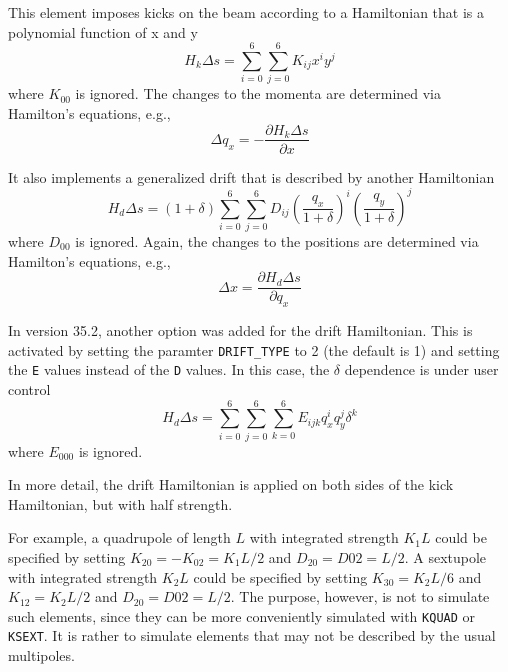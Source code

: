 This element imposes kicks on the beam according
to a Hamiltonian that is a polynomial function of x and y 
\begin{equation}
H_k\Delta s = \sum_{i=0}^{6} \sum_{j=0}^{6} K_{ij} x^i y^j 
\end{equation}
where $K_{00}$ is ignored.
The changes to the momenta are determined via Hamilton's equations, e.g.,
\begin{equation}
\Delta q_x = -\frac{\partial H_k\Delta s}{\partial x}
\end{equation}

It also implements a generalized drift that is described by another Hamiltonian
\begin{equation}
H_d\Delta s = (1+\delta) \sum_{i=0}^{6} \sum_{j=0}^{6} D_{ij} \left(\frac{q_x}{1+\delta}\right)^i \left(\frac{q_y}{1+\delta}\right)^j
\end{equation}
where $D_{00}$ is ignored.
Again, the changes to the positions are determined via Hamilton's equations, e.g., 
\begin{equation}
\Delta x = \frac{\partial H_d\Delta s}{\partial q_x}
\end{equation}

In version 35.2, another option was added for the drift Hamiltonian.
This is activated by setting the paramter \verb|DRIFT_TYPE| to 2 (the default is 1)
and setting the \verb|E| values instead of the \verb|D| values.
In this case, the $\delta$ dependence is under user control
\begin{equation}
H_d\Delta s = \sum_{i=0}^{6} \sum_{j=0}^{6} \sum_{k=0}^{6} E_{ijk} q_x^i q_y^j \delta^k
\end{equation}
where $E_{000}$ is ignored.

In more detail, the drift Hamiltonian is applied on both sides of the kick Hamiltonian, but with
half strength. 

For example, a quadrupole of length $L$ with integrated strength $K_1 L$  could be specified by setting
$K_{20} = -K_{02} = K_1 L/2$ and $D_20 = D02 = L/2$.
A sextupole with integrated strength $K_2 L$ could be specified by setting $K_{30} = K_2 L/6$ and $K_{12} = K_2 L/2$
and $D_20 = D02 = L/2$.
The purpose, however, is not to simulate such elements, since they can be more conveniently simulated with 
\verb|KQUAD| or \verb|KSEXT|.
It is rather to simulate elements that may not be described by the usual multipoles.

